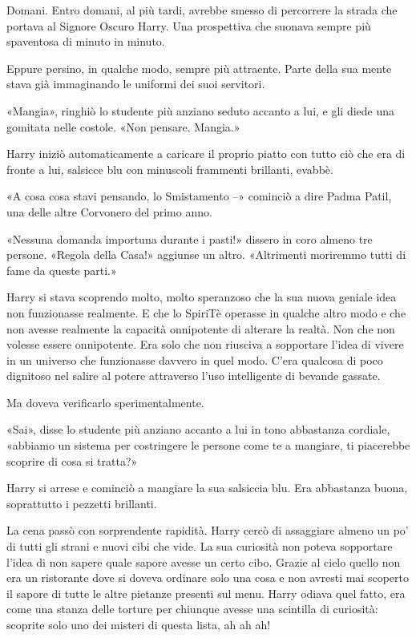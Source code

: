 Domani. Entro domani, al più tardi, avrebbe smesso di percorrere la strada che portava al Signore Oscuro Harry. Una prospettiva che suonava sempre più spaventosa di minuto in minuto.

Eppure persino, in qualche modo, sempre più attraente. Parte della sua mente stava già immaginando le uniformi dei suoi servitori.

«Mangia», ringhiò lo studente più anziano seduto accanto a lui, e gli diede una gomitata nelle costole. «Non pensare. Mangia.»

Harry iniziò automaticamente a caricare il proprio piatto con tutto ciò che era di fronte a lui, salsicce blu con minuscoli frammenti brillanti, evabbè.

«A cosa cosa stavi pensando, lo Smistamento –» cominciò a dire Padma Patil, una delle altre Corvonero del primo anno.

«Nessuna domanda importuna durante i pasti!» dissero in coro almeno tre persone. «Regola della Casa!» aggiunse un altro. «Altrimenti moriremmo tutti di fame da queste parti.»

Harry si stava scoprendo molto, molto speranzoso che la sua nuova geniale idea non funzionasse realmente. E che lo SpiriTè operasse in qualche altro modo e che non avesse realmente la capacità onnipotente di alterare la realtà. Non che non volesse essere onnipotente. Era solo che non riusciva a sopportare l’idea di vivere in un universo che funzionasse davvero in quel modo. C’era qualcosa di poco dignitoso nel salire al potere attraverso l’uso intelligente di bevande gassate.

Ma doveva verificarlo sperimentalmente.

«Sai», disse lo studente più anziano accanto a lui in tono abbastanza cordiale, «abbiamo un sistema per costringere le persone come te a mangiare, ti piacerebbe scoprire di cosa si tratta?»

Harry si arrese e cominciò a mangiare la sua salsiccia blu. Era abbastanza buona, soprattutto i pezzetti brillanti.

La cena passò con sorprendente rapidità. Harry cercò di assaggiare almeno un po’ di tutti gli strani e nuovi cibi che vide. La sua curiosità non poteva sopportare l’idea di non sapere quale sapore avesse un certo cibo. Grazie al cielo quello non era un ristorante dove si doveva ordinare solo una cosa e non avresti mai scoperto il sapore di tutte le altre pietanze presenti sul menu. Harry odiava quel fatto, era come una stanza delle torture per chiunque avesse una scintilla di curiosità: scoprite solo uno dei misteri di questa lista, ah ah ah!

